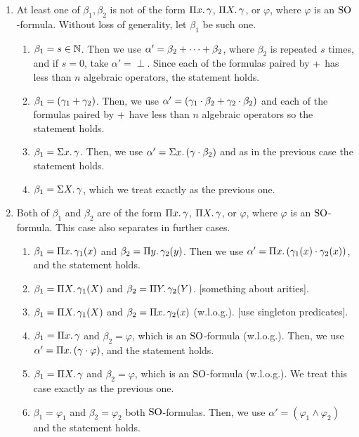 \begin{enumerate}
	\item At least one of $\beta_1, \beta_2$ is not of the form $\Pi{x}.\, \gamma$, $\Pi{X}.\, \gamma$, or $\varphi$, where $\varphi$ is an ${\rm SO}$-formula. Without loss of generality, let $\beta_1$ be such one.
	\begin{enumerate}
		\item $\beta_1 = s \in \mathbb{N}$. Then we use $\alpha' = \beta_2 + \cdots + \beta_2$, where $\beta_2$ is repeated $s$ times, and if $s = 0$, take $\alpha' = \perp$. Since each of the formulas paired by $+$ has less than $n$ algebraic operators, the statement holds.
		\item $\beta_1 = (\gamma_1 + \gamma_2)$. Then, we use $\alpha' = (\gamma_1\cdot\beta_2 + \gamma_2\cdot\beta_2)$ and each of the formulas paired by $+$ have less than $n$ algebraic operators so the statement holds.
		\item $\beta_1 = \Sigma{x}.\, \gamma$. Then, we use $\alpha' = \Sigma{x}.\, (\gamma\cdot\beta_2)$ and as in the previous case the statement holds.
		\item $\beta_1 = \Sigma{X}.\, \gamma$, which we treat exactly as the previous one.
	\end{enumerate}
	\item Both of $\beta_1$ and $\beta_2$ are of the form $\Pi{x}.\, \gamma$, $\Pi{X}.\, \gamma$, or $\varphi$, where $\varphi$ is an ${\rm SO}$-formula. This case also separates in further cases.
	\begin{enumerate}
		\item $\beta_1 = \Pi{x}.\, \gamma_1(x)$ and $\beta_2 = \Pi{y}.\, \gamma_2(y)$. Then we use $\alpha' = \Pi{x}.\,(\gamma_1(x)\cdot\gamma_2(x))$, and the statement holds.
		\item $\beta_1 = \Pi{X}.\, \gamma_1(X)$ and $\beta_2 = \Pi{Y}.\, \gamma_2(Y)$. [something about arities].
		\item $\beta_1 = \Pi{X}.\, \gamma_1(X)$ and $\beta_2 = \Pi{x}.\, \gamma_2(x)$ (w.l.o.g.). [use singleton predicates].
		\item $\beta_1 = \Pi{x}.\, \gamma$ and $\beta_2 = \varphi$, which is an ${\rm SO}$-formula (w.l.o.g.). Then, we use $\alpha' = \Pi{x}.\, (\gamma \cdot \varphi)$, and the statement holds.
		\item $\beta_1 = \Pi{X}.\, \gamma$ and $\beta_2 = \varphi$, which is an ${\rm SO}$-formula (w.l.o.g.). We treat this case exactly as the previous one.
		\item $\beta_1 = \varphi_1$ and $\beta_2 = \varphi_2$ both ${\rm SO}$-formulas. Then, we use $\alpha' = (\varphi_1 \wedge \varphi_2)$ and the statement holds.
	\end{enumerate}
\end{enumerate}



